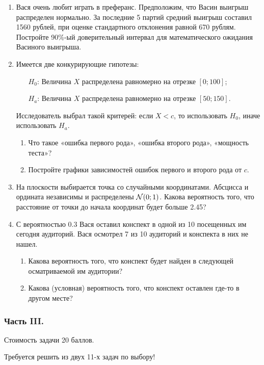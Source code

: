 \begin{enumerate}
\item Вася очень любит играть в преферанс. Предположим, что Васин
выигрыш распределен нормально. За последние 5 партий средний
выигрыш составил 1560 рублей, при оценке стандартного отклонения
равной 670 рублям. Постройте 90\%-ый доверительный интервал для
математического ожидания Васиного выигрыша.

\item Имеется две конкурирующие гипотезы:
\begin{enumerate}
\item[$H_{0}$:] Величина $X$ распределена равномерно на отрезке $[0;100]$;
\item[$H_{a}$:] Величина $X$ распределена равномерно на отрезке $[50;150]$.
\end{enumerate}
Исследователь выбрал такой критерей: если $X<c$, то использовать $H_{0}$, иначе использовать $H_{a}$.
\begin{enumerate}
\item Что такое «ошибка первого
рода», «ошибка второго рода»,
«мощность теста»?
\item Постройте графики зависимостей ошибок первого и второго рода от $c$.
\end{enumerate}

\item На плоскости выбирается точка со случайными координатами. Абсцисса
и ордината независимы и распределены $\mathcal{N}(0;1)$. Какова вероятность
того, что расстояние от точки до начала координат будет больше
2.45?

\item С вероятностью 0.3 Вася оставил конспект в одной из 10 посещенных
им сегодня аудиторий. Вася осмотрел 7 из 10 аудиторий и конспекта в них не нашел.
\begin{enumerate}
\item Какова вероятность того, что конспект будет найден в
следующей осматриваемой им аудитории?
\item Какова (условная) вероятность того, что конспект оставлен
где-то в другом месте?
\end{enumerate}
\end{enumerate}

\subsubsection*{Часть III.}

Стоимость задачи 20 баллов.

Требуется решить {\bf {}} из двух 11-х задач по
выбору!

